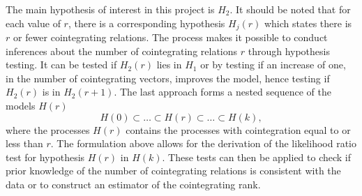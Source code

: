 The main hypothesis of interest in this project is $H_2$. It should be noted that for each value of $r$, there is a corresponding hypothesis $H_j(r)$ which states there is $r$ or fewer cointegrating relations. 
 \newline
 The process makes it possible to conduct inferences about the number of cointegrating relations $r$ through hypothesis testing. It can be tested if $H_2(r)$ lies in $H_1$ or by testing if an increase of one, in the number of cointegrating vectors, improves the model, hence testing if $H_2(r)$ is in $H_2(r+1)$. The last approach forms a nested sequence of the models $H(r)$
\begin{equation*}
    H(0) \subset \dots \subset H(r) \subset \dots \subset H(k),
\end{equation*}
where the processes $H(r)$ contains the processes with cointegration equal to or less than $r$. The formulation above allows for the derivation of the likelihood ratio test for hypothesis $H(r)$ in $H(k)$. These tests can then be applied to check if prior knowledge of the number of cointegrating relations is consistent with the data or to construct an estimator of the cointegrating rank.



